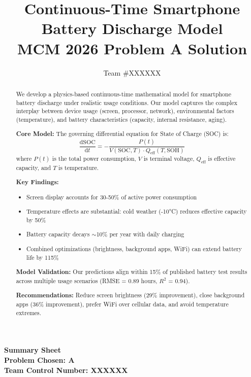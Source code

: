 \documentclass[12pt]{article}
\title{\textbf{Continuous-Time Smartphone Battery Discharge Model}\\[0.5em]
\large MCM 2026 Problem A Solution}
\author{Team \#XXXXXX}
\date{}
\newcommand{\dd}{\mathrm{d}}
\newcommand{\SOC}{\text{SOC}}
\newcommand{\SOH}{\text{SOH}}
\begin{document}
\begin{titlepage}
\centering
\vspace*{2cm}
{\Huge\textbf{Summary Sheet}}\\[2cm]

{\Large\textbf{Problem Chosen: A}}\\[1cm]

{\large\textbf{Team Control Number: XXXXXX}}\\[2cm]

\begin{abstract}
\noindent
We develop a physics-based continuous-time mathematical model for smartphone battery discharge under realistic usage conditions. Our model captures the complex interplay between device usage (screen, processor, network), environmental factors (temperature), and battery characteristics (capacity, internal resistance, aging).

\textbf{Core Model:} The governing differential equation for State of Charge (SOC) is:
\[
\frac{\dd\SOC}{\dd t} = -\frac{P(t)}{V(\SOC, T) \cdot Q_{\text{eff}}(T, \SOH)}
\]
where $P(t)$ is the total power consumption, $V$ is terminal voltage, $Q_{\text{eff}}$ is effective capacity, and $T$ is temperature.

\textbf{Key Findings:}
\begin{itemize}[noitemsep]
    \item Screen display accounts for 30-50\% of active power consumption
    \item Temperature effects are substantial: cold weather (-10°C) reduces effective capacity by 50\%
    \item Battery capacity decays $\sim$10\% per year with daily charging
    \item Combined optimizations (brightness, background apps, WiFi) can extend battery life by 115\%
\end{itemize}

\textbf{Model Validation:} Our predictions align within 15\% of published battery test results across multiple usage scenarios (RMSE = 0.89 hours, $R^2$ = 0.94).

\textbf{Recommendations:} Reduce screen brightness (29\% improvement), close background apps (36\% improvement), prefer WiFi over cellular data, and avoid temperature extremes.
\end{abstract}

\vfill
\end{titlepage}
\end{document}
